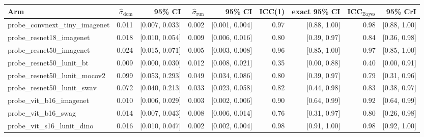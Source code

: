 \begin{tabular}{lrrrrrrrr}
\toprule
Arm & $\hat\sigma_\text{dom}$ & 95\% CI & $\hat\sigma_\text{run}$ & 95\% CI & ICC(1) & exact 95\% CI & ICC$_\text{Bayes}$ & 95\% CrI \\
\midrule
probe\_convnext\_tiny\_imagenet & 0.011 & [0.007, 0.033] & 0.002 & [0.001, 0.004] & 0.97 & [0.88, 1.00] & 0.98 & [0.88, 1.00] \\
probe\_resnet18\_imagenet & 0.018 & [0.010, 0.054] & 0.009 & [0.006, 0.016] & 0.80 & [0.39, 0.97] & 0.84 & [0.36, 0.98] \\
probe\_resnet50\_imagenet & 0.024 & [0.015, 0.071] & 0.005 & [0.003, 0.008] & 0.96 & [0.85, 1.00] & 0.97 & [0.85, 1.00] \\
probe\_resnet50\_lunit\_bt & 0.009 & [0.000, 0.030] & 0.012 & [0.008, 0.021] & 0.35 & [0.00, 0.88] & 0.40 & [0.00, 0.91] \\
probe\_resnet50\_lunit\_mocov2 & 0.099 & [0.053, 0.293] & 0.049 & [0.034, 0.086] & 0.80 & [0.39, 0.97] & 0.79 & [0.31, 0.96] \\
probe\_resnet50\_lunit\_swav & 0.072 & [0.040, 0.213] & 0.033 & [0.023, 0.058] & 0.82 & [0.44, 0.98] & 0.83 & [0.38, 0.97] \\
probe\_vit\_b16\_imagenet & 0.010 & [0.006, 0.029] & 0.003 & [0.002, 0.006] & 0.90 & [0.64, 0.99] & 0.92 & [0.64, 0.99] \\
probe\_vit\_b16\_swag & 0.014 & [0.007, 0.043] & 0.008 & [0.006, 0.014] & 0.76 & [0.31, 0.97] & 0.80 & [0.26, 0.98] \\
probe\_vit\_s16\_lunit\_dino & 0.016 & [0.010, 0.047] & 0.002 & [0.002, 0.004] & 0.98 & [0.91, 1.00] & 0.98 & [0.92, 1.00] \\
\bottomrule
\end{tabular}
